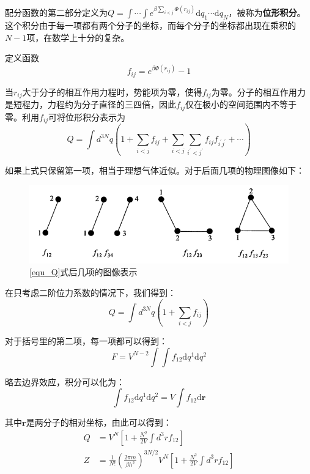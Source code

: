 \documentclass[UTF8]{ctexart}
\newcommand{\dif}{\mathrm{d}}
\begin{document}
	配分函数的第二部分定义为$ Q=\int \cdots \int e^{\beta \sum_{i<j} \Phi \left(r_{ij}\right)} \dif q_{1} \cdots \dif q_{N} $，被称为\textbf{位形积分}。这个积分由于每一项都有两个分子的坐标，而每个分子的坐标都出现在乘积的$ N-1 $项，在数学上十分的复杂。
	
	定义函数
	\begin{equation}
		f_{ij} = e^{\beta \Phi \left(r_{ij}\right)}-1
	\end{equation}
	
\noindent 当$ r_{ij} $大于分子的相互作用力程时，势能项为零，使得$ f_{ij} $为零。分子的相互作用力是短程力，力程约为分子直径的三四倍，因此$ f_{ij} $仅在极小的空间范围内不等于零。利用$ f_{ij} $可将位形积分表示为
\begin{equation}
Q=\int d^{3 N} q\left(1+\sum_{i<j} f_{i j}+\sum_{i<j} \sum_{i^{\prime}<j^{\prime}} f_{i j} f_{i^{\prime} j^{\prime}}+\cdots\right)\label{equ_Q}
\end{equation}

\noindent 如果上式只保留第一项，相当于理想气体近似。对于后面几项的物理图像如下：
\begin{figure}[ht]
	\centering
	\includegraphics[width=12cm]{static_pratical_gas.png}
	\caption{\ref{equ_Q}式后几项的图像表示}
	\label{figure_practical_gas}
\end{figure}

	在只考虑二阶位力系数的情况下，我们得到：
	\begin{equation}
	Q=\int d^{3 N} q\left(1+\sum_{i<j} f_{i j}\right)
	\end{equation}
	
	对于括号里的第二项，每一项都可以得到：
	\begin{equation}
		F=V^{N-2} \int \int f_{12} \dif q^{1} \dif q^{2}
	\end{equation}
	
\noindent 略去边界效应，积分可以化为：
\begin{equation}
	\int f_{12} \dif q^{1} \dif q^{2} = V \int f_{12} \dif \mathbf{r}
\end{equation}

\noindent 其中$ \mathbf{r} $是两分子的相对坐标，由此可以得到：
\begin{equation}
	\begin{aligned}
	Q&=V^{N}\left[1+\frac{N^{2}}{2 V} \int d^{3} r f_{12}\right]\\
	Z&=\frac{1}{N !}\left(\frac{2 \pi m}{\beta h^{2}}\right)^{3 N / 2} V^{N}\left[1+\frac{N^{2}}{2 V} \int d^{3} r f_{12}\right]
	\end{aligned}
\end{equation}
\end{document}

